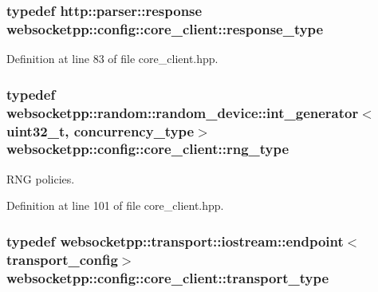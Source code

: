 \hypertarget{structwebsocketpp_1_1config_1_1core__client_a5d8d6a90c7f36442a61a615da2ac8dcc}{}
\subsubsection[{response\+\_\+type}]{\setlength{\rightskip}{0pt plus 5cm}typedef {\bf http\+::parser\+::response} {\bf websocketpp\+::config\+::core\+\_\+client\+::response\+\_\+type}}\label{structwebsocketpp_1_1config_1_1core__client_a5d8d6a90c7f36442a61a615da2ac8dcc}


Definition at line 83 of file core\+\_\+client.\+hpp.

\hypertarget{structwebsocketpp_1_1config_1_1core__client_adacb3a0ec249a2dea11871f299cf660f}{}
\subsubsection[{rng\+\_\+type}]{\setlength{\rightskip}{0pt plus 5cm}typedef {\bf websocketpp\+::random\+::random\+\_\+device\+::int\+\_\+generator}$<$uint32\+\_\+t, {\bf concurrency\+\_\+type}$>$ {\bf websocketpp\+::config\+::core\+\_\+client\+::rng\+\_\+type}}\label{structwebsocketpp_1_1config_1_1core__client_adacb3a0ec249a2dea11871f299cf660f}


R\+N\+G policies. 



Definition at line 101 of file core\+\_\+client.\+hpp.

\hypertarget{structwebsocketpp_1_1config_1_1core__client_a8aafafefe476f36425d0fa2059a4db2a}{}
\subsubsection[{transport\+\_\+type}]{\setlength{\rightskip}{0pt plus 5cm}typedef {\bf websocketpp\+::transport\+::iostream\+::endpoint}$<${\bf transport\+\_\+config}$>$ {\bf websocketpp\+::config\+::core\+\_\+client\+::transport\+\_\+type}}\label{structwebsocketpp_1_1config_1_1core__client_a8aafafefe476f36425d0fa2059a4db2a}


